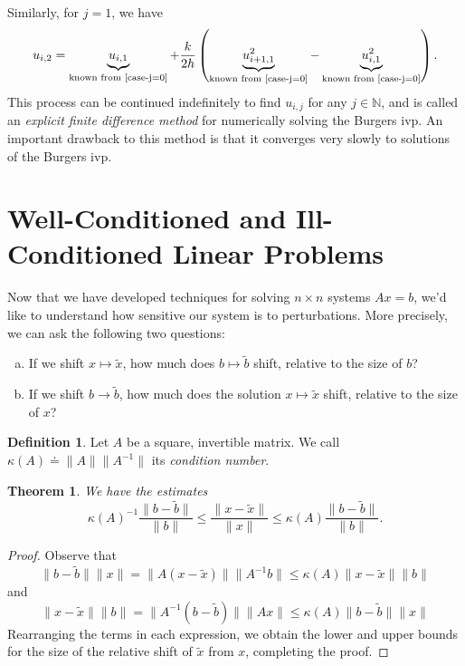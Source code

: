 \documentclass[12pt]{article}
\theoremstyle{plain}
\newtheorem{theorem}{Theorem}
\theoremstyle{definition}
\newtheorem*{definition}{Definition}
\theoremstyle{remark}
\numberwithin{equation}{section}  %
\begin{document}
		Similarly, for $j=1$, we have
		\begin{equation*}
			\begin{split}
				u_{i,2} = \underbrace{u_{i,1}}_{\text{known from
				\eqref{case-j=0}}} + \frac{k}{2h}\left(
					\underbrace{u_{i+1,1}^{2}}_{\text{known from \eqref{case-j=0}}} -
					\underbrace{u_{i,1}^{2}}_{\text{known from
				\eqref{case-j=0}}} \right).
			\end{split}
		\end{equation*} 
		This process can be
		continued indefinitely to find $u_{i, j}$ for any $j \in \mathbb{N}$, and is
		called an \emph{explicit finite difference method} for numerically solving the
		Burgers ivp. An important drawback to this method is that it converges very
		slowly to solutions of the Burgers ivp.
		\section{Well-Conditioned and Ill-Conditioned Linear Problems}
		Now that we have developed techniques for solving $n \times n$
		systems $Ax = b$, we'd like to understand how sensitive our system
		is to perturbations. More precisely, we can ask the following two questions:
		\begin{enumerate}[a)]
		\item If we shift $x \mapsto \tilde{x}$, how much does $b \mapsto 
			\tilde{b}$ shift, relative to the size of $b$?
		\item If we shift $b \to \tilde{b}$, how much does the solution $x \mapsto
			\tilde{x}$ shift, relative to the size of $x$?
	\end{enumerate}
	\begin{definition}
		Let $A$ be a square, invertible matrix. We call $\kappa(A) \doteq \| A \| \| A^{-1} \|$
		its \emph{condition number}.
	\end{definition}
	\begin{theorem}
		We have the estimates
		\begin{equation*}
			\kappa(A)^{-1} \frac{\| b - \tilde{b}\|}{\| b\|} \le \frac{\| x - \tilde{x} \|}{\| x \|}
			\le \kappa(A) \frac{ \| b - \tilde{b} \|}{ \| b \| }.
		\end{equation*}
	\end{theorem}
	\begin{proof}
		Observe that
		\begin{equation*}
			\| b - \tilde{b} \| \| x \| = \| A(x - \tilde{x})\| \| A^{-1}b \| 
			\le \kappa(A) \| x - \tilde{x} \| \| b \|
		\end{equation*}
		and
		\begin{equation*}
			\| x - \tilde{x} \| \| b \| = \| A^{-1}(b - \tilde{b})\| \| Ax \| 
			\le \kappa(A) \| b - \tilde{b} \| \| x \|
		\end{equation*}
		Rearranging the terms in each expression, we obtain the lower and upper
		bounds for the size of the relative shift of $\tilde{x}$ from $x$, completing
		the proof.
	\end{proof}
\end{document}

